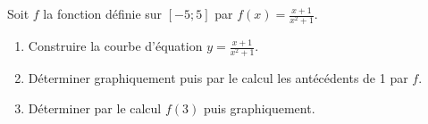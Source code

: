 
Soit $f$ la fonction définie sur $[-5;5]$ par $f(x)=\frac{x+1}{x^2+1}$.
\begin{enumerate}
\item Construire la courbe d'équation $y=\frac{x+1}{x^2+1}$.
\item Déterminer graphiquement puis par le calcul les antécédents de 1 par $f$.
\item Déterminer par le calcul $f(3)$ puis graphiquement.
\end{enumerate}

